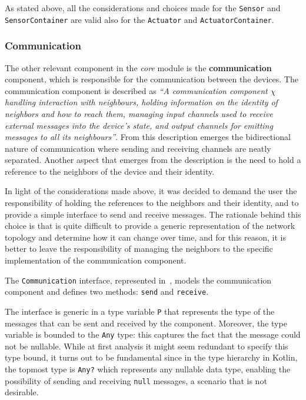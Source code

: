 

As stated above, all the considerations and choices made for the \texttt{Sensor} and \texttt{SensorContainer} are valid also for the \texttt{Actuator}
and \texttt{ActuatorContainer}.

\subsubsection{Communication}

The other relevant component in the \emph{core} module is the \textbf{communication} component, which is responsible for the communication between
the devices.
The communication component is described as \textit{``A communication component $\chi$ handling interaction with neighbours, holding information on
	the identity of neighbors and how to reach them, managing input channels used to receive external messages into the device’s state, and output
	channels for emitting messages to all its neighbours''}.
From this description emerges the bidirectional nature of communication where sending and receiving channels are neatly separated.
Another aspect that emerges from the description is the need to hold a reference to the neighbors of the device and their identity.

In light of the considerations made above, it was decided to demand the user the responsibility of holding the references to the neighbors and
their identity, and to provide a simple interface to send and receive messages. The rationale behind this choice is that is quite difficult to
provide a generic representation of the network topology and determine how it can change over time, and for this reason, it is better to leave the
responsibility of managing the neighbors to the specific implementation of the communication component.

The \texttt{Communication} interface, represented in~, models the communication component and defines
two methods: \texttt{send} and \texttt{receive}.



The interface is generic in a type variable \texttt{P} that represents the type of the messages that can be sent and received by the component.
Moreover, the type variable is bounded to the \texttt{Any} type: this captures the fact that the message could not be nullable.
While at first analysis it might seem redundant to specify this type bound, it turns out to be fundamental since in the type hierarchy in Kotlin, the
topmost type is \texttt{Any?} which represents any nullable data type, enabling the possibility of sending and receiving \texttt{null} messages,
a scenario that is not desirable.

